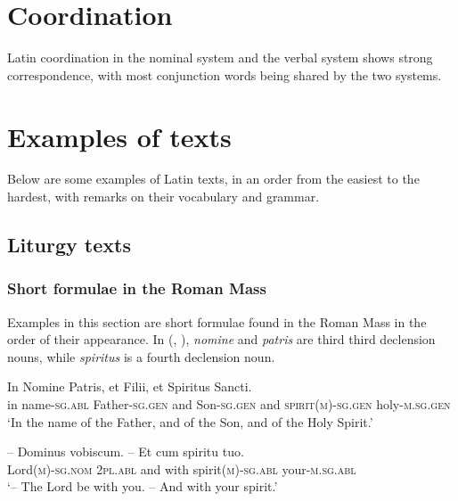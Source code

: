\documentclass[a4paper, oneside]{report}
\newcommand{\form}[1]{\emph{#1}}
\newcommand*{\category}[1]{\textsc{#1}}
\newcommand{\translate}[1]{`#1'}
\begin{document}
\chapter{Coordination}

Latin coordination in the nominal system and the verbal system 
shows strong correspondence,
with most conjunction words being shared
by the two systems.


\chapter{Examples of texts}

Below are some examples of Latin texts, 
in an order from the easiest to the hardest,
with remarks on their vocabulary and grammar. 

\section{Liturgy texts}

\subsection{Short formulae in the Roman Mass}

Examples in this section are short formulae found in the Roman Mass
in the order of their appearance.
In (, ),
\form{nomine} and \form{patris} are third third declension nouns, 
while \form{spiritus} is a fourth declension noun. 

\begin{exe}
    \ex\label{ex:text.mass.1} \gll In Nomine Patris, et Filii, et Spiritus Sancti. \\
    in name-\category{sg}.\category{abl} Father-\category{sg}.\category{gen} 
    and Son-\category{sg}.\category{gen} 
    and \category{spirit}(\category{m})-\category{sg}.\category{gen}
    holy-\category{m}.\category{sg}.\category{gen} \\
    \glt \translate{In the name of the Father, and of the Son, and of the Holy Spirit.}

    \ex\label{ex:text.mass.2} \gll -- Dominus vobiscum. -- Et cum spiritu tuo. \\
    {} Lord(\category{m})-\category{sg}.\category{nom} 
    \category{2pl}.\category{abl} 
    {} and with spirit(\category{m})-\category{sg}.\category{abl} 
    your-\category{m}.\category{sg}.\category{abl} \\
    \glt \translate{-- The Lord be with you. -- And with your spirit.}
    
    \ex 
\end{exe}
\end{document}
